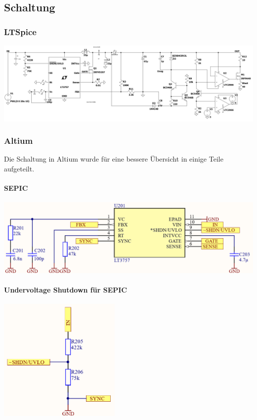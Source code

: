 \documentclass[paper=a4, 12pt]{scrreprt}
\begin{document}
		\subsection{Schaltung}
			\subsubsection{LTSpice}
			\begin{adjustbox}{center,caption={Simulationsschaltung des Analogteils in LTSpice},label={fig:LTSpice-Schaltung-Analogteil},nofloat=figure,vspace=\bigskipamount}
				\includegraphics[width=\textwidth]{img/LTSpice_Schaltung_Analogteil.PNG}
			\end{adjustbox}
			\subsubsection{Altium}
			Die Schaltung in Altium wurde für eine bessere Übersicht in einige Teile aufgeteilt.
			\paragraph{SEPIC}
			\begin{adjustbox}{center,caption={},label={fig:},nofloat=figure,vspace=\bigskipamount}
				\includegraphics[width=\textwidth]{img/SEPIC_Altium.PNG}
			\end{adjustbox}
			\paragraph{Undervoltage Shutdown für SEPIC}
			\begin{adjustbox}{center,caption={},label={fig:},nofloat=figure,vspace=\bigskipamount}
				\includegraphics[height=6cm]{img/Undervolteage_Shutdown_SEPIC.PNG}
			\end{adjustbox}
\end{document}
